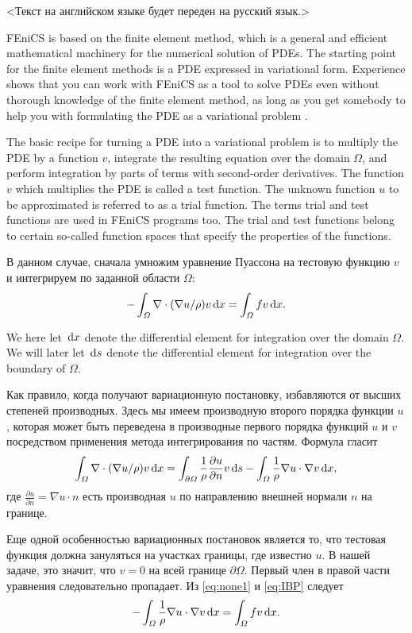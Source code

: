 <Текст на английском языке будет переден на русский язык.>

FEniCS is based on the finite element method, which is a general and efficient
mathematical machinery for the numerical solution of PDEs. The starting
point for the finite element methods is a PDE expressed in variational form.
Experience shows that you can work with FEniCS as
a tool to solve PDEs even without thorough knowledge of the finite element
method, as long as you get somebody to help you with formulating the PDE
as a variational problem \cite[с. 12]{FEniCS}.

The basic recipe for turning a PDE into a variational problem is to multiply
the PDE by a function $v$, integrate the resulting equation over the domain $\Omega$,
and perform integration by parts of terms with second-order derivatives. The
function $v$ which multiplies the PDE is called a test function. The unknown
function $u$ to be approximated is referred to as a trial function. The terms
trial and test functions are used in FEniCS programs too. The trial and
test functions belong to certain so-called function spaces that specify the
properties of the functions.

В данном случае, сначала умножим уравнение Пуассона на тестовую функцию $v$ и интегрируем по заданной области $\Omega$: 
\begin{equation} \label{eq:none1}
  - \int_\varOmega \nabla \cdot (\nabla u / \rho)v \, \mathrm{d}x 
  = \int_\varOmega f v \, \mathrm{d}x.
\end{equation}

We here let $\, \mathrm{d}x$ denote the differential element for integration over the domain
$\Omega$. We will later let $\, \mathrm{d}s$ denote the differential element for integration over
the boundary of $\Omega$.

Как правило, когда получают вариационную постановку, избавляются от высших степеней производных.
Здесь мы имеем производную второго порядка функции $u$, которая может быть переведена в производные первого порядка функций $u$ и $v$ посредством применения метода интегрирования по частям.
Формула гласит
\begin{equation} \label{eq:IBP}
  \int_\varOmega \nabla \cdot (\nabla u / \rho)v \, \mathrm{d}x
= \int_{\partial\varOmega} \frac 1 \rho {\partial u\over\partial n}v \, \mathrm{d}s
- \int_\varOmega \frac 1 \rho \nabla u\cdot\nabla v \, \mathrm{d}x,
\end{equation}
где $\frac{\partial u}{\partial n} = \nabla u \cdot n$ есть производная $u$ по направлению внешней нормали $n$ на границе.

Еще одной особенностью вариационных постановок является то, что тестовая функция должна зануляться на участках границы, где известно $u$.
В нашей задаче, это значит, что $v = 0$ на всей границе $\partial\Omega$.
Первый член в правой части уравнения следовательно пропадает.
Из \eqref{eq:none1} и \eqref{eq:IBP} следует
\begin{equation} \label{eq:weakform}
- \int_\varOmega \frac 1 \rho \nabla u\cdot\nabla v \, \mathrm{d}x = \int_\varOmega f v \, \mathrm{d}x.
\end{equation}

